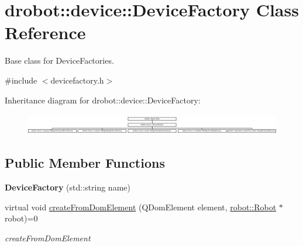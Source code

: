 \hypertarget{classdrobot_1_1device_1_1DeviceFactory}{\section{drobot\-:\-:device\-:\-:Device\-Factory Class Reference}
\label{classdrobot_1_1device_1_1DeviceFactory}
}


Base class for Device\-Factories.  




{\ttfamily \#include $<$devicefactory.\-h$>$}

Inheritance diagram for drobot\-:\-:device\-:\-:Device\-Factory\-:\begin{figure}[H]
\begin{center}
\leavevmode
\includegraphics[height=0.930748cm]{classdrobot_1_1device_1_1DeviceFactory}
\end{center}
\end{figure}
\subsection*{Public Member Functions}
\begin{DoxyCompactItemize}
\item 
\hypertarget{classdrobot_1_1device_1_1DeviceFactory_acea73cfabc75353be27326f794cd9f1b}{{\bfseries Device\-Factory} (std\-::string name)}\label{classdrobot_1_1device_1_1DeviceFactory_acea73cfabc75353be27326f794cd9f1b}

\item 
virtual void \hyperlink{classdrobot_1_1device_1_1DeviceFactory_af9234abdb75d5a0129630baabe0c98cc}{create\-From\-Dom\-Element} (Q\-Dom\-Element element, \hyperlink{classdrobot_1_1robot_1_1Robot}{robot\-::\-Robot} $\ast$robot)=0
\begin{DoxyCompactList}\small\item\em create\-From\-Dom\-Element \end{DoxyCompactList}\end{DoxyCompactItemize}
